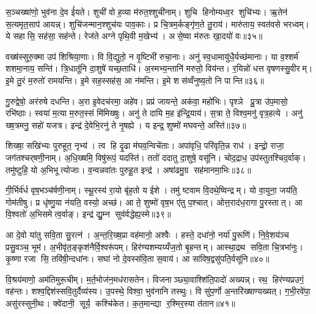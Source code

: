 स॒ञ्चख्षा॑णो॒ भुव॑ना दे॒व ई॑यते। शुची॑ वो ह॒व्या म॑रुत॒श्शुची॑नाम्। शुचि हिनोम्यध्व॒र शुचि॑भ्यः। ऋ॒तेन॑ स॒त्यमृत॒साप॑ आयन्न्। शुचि॑जन्मान॒श्शुच॑यः पाव॒काः। प्र चि॒त्रम॒र्कङ्गृ॑ण॒ते तु॒राय॑। मारु॑ताय॒ स्वत॑वसे भरध्वम्। ये सहासि॒ सह॑सा॒ सह॑न्ते। रेज॑ते अग्ने पृथि॒वी म॒खेभ्य॑। असे॒ष्वा म॑रुतः खा॒दयो॑ वः॥३५॥

वख्ष॑स्सुरु॒क्मा उप॑ शिश्रिया॒णाः। वि वि॒द्युतो॒ न वृ॒ष्टिभी॑ रुचा॒नाः। अनु॑ स्व॒धामायु॑धै॒र्यच्छ॑मानाः। या व॒श्शर्म॑ शशमा॒नाय॒ सन्ति॑। त्रि॒धातू॑नि दा॒शुषे॑ यच्छ॒ताधि॑। अ॒स्मभ्य॒न्तानि॑ मरुतो॒ विय॑न्त। र॒यिन्नो॑ धत्त वृषणस्सु॒वीरम्। इ॒मे तु॒रं म॒रुतो॑ रामयन्ति। इ॒मे सह॒स्सह॑स॒ आ न॑मन्ति। इ॒मे शस॑व्वँनुष्य॒तो नि पान्ति॥३६॥

गु॒रुद्वेषो॒ अर॑रुषे दधन्ति। अ॒रा इ॒वेदच॑रमा॒ अहे॑व। प्रप्र॑ जायन्ते॒ अक॑वा॒ महो॑भिः। पृश्ञे प्रु॒त्रा उ॑प॒मासो॒ रभि॑ष्ठाः। स्वया॑ म॒त्या म॒रुत॒स्सं मि॑मिख्षुः। अनु॑ ते दायि म॒ह इ॑न्द्रि॒याय॑। स॒त्रा ते॒ विश्व॒मनु॑ वृत्र॒हत्ये। अनु॑ ख्ष॒त्रमनु॒ सहो॑ यजत्र। इन्द्र॑ दे॒वेभि॒रनु॑ ते नृ॒षह्ये। य इन्द्र॒ शुष्मो॑ मघवन्ते॒ अस्ति॑॥३७॥

शिख्षा॒ सखि॑भ्यः पुरुहूत॒ नृभ्य॑। त्व हि दृ॒ढा म॑घव॒न्विचे॑ताः। अपा॑वृधि॒ परि॑वृति॒न्न राध॑। इन्द्रो॒ राजा॒ जग॑तश्चर्‌षणी॒नाम्। अ॒धि॒ख्षमि॒ विषु॑रूपं॒ यदस्ति॑। ततो॑ ददातु दा॒शुषे॒ वसू॑नि। चोद॒द्राध॒ उप॑स्तुतश्चिद॒र्वाक्। तमु॑ष्टुहि॒ यो अ॒भिभूत्योजाः। व॒न्वन्नवा॑तः पुरुहू॒त इन्द्र॑। अषा॑ढमु॒ग्र सह॑मानमा॒भिः॥३८॥

गी॒र्भिर्व॑र्ध वृष॒भञ्च॑र्\mbox{}षणी॒नाम्। स्थू॒रस्य॑ रा॒यो बृ॑ह॒तो य ईशे। तमु॑ ष्टवाम वि॒दथे॒ष्विन्द्रम्। यो वा॒युना॒ जय॑ति॒ गोम॑तीषु। प्र धृ॑ष्णु॒या न॑यति॒ वस्यो॒ अच्छ॑। आ ते॒ शुष्मो॑ वृष॒भ ए॑तु प॒श्चात्। ओत्त॒राद॑ध॒रागा पु॒रस्तात्। आ वि॒श्वतो॑ अ॒भिसमेत्व॒र्वाङ्। इन्द्र॑ द्यु॒म्न सुव॑र्वद्धेह्य॒स्मे॥३९॥\anuvakamend[व॒राहैर्वि॒श्वहा॑ऽजनिष्ट पू॒षोद्वरी॑वृजत्खा॒दयो॑ वः पा॒न्त्यस्त्या॒भिर्नव॑ च]

आ दे॒वो या॑तु सवि॒ता सु॒रत्न॑। अ॒न्त॒रि॒ख्ष॒प्रा वह॑मानो॒ अश्वैः। हस्ते॒ दधा॑नो॒ नर्या॑ पु॒रूणि॑। नि॒वे॒शय॑ञ्च प्रसु॒वञ्च॒ भूम॑। अ॒भीवृ॑त॒ङ्कृश॑नैर्वि॒श्वरू॑पम्। हिर॑ण्यशम्यय्यँज॒तो बृ॒हन्तम्। आस्था॒द्रथ सवि॒ता चि॒त्रभा॑नुः। कृ॒ष्णा रजा सि॒ तवि॑षी॒न्दधा॑नः। सघा॑ नो दे॒वस्स॑वि॒ता स॒वाय॑। आ सा॑विष॒द्वसु॑पति॒र्वसू॑नि॥४०॥

वि॒श्रय॑माणो॒ अम॑तिमुरू॒चीम्। म॒र्त॒भोज॑न॒मध॑रासतेन। विजनाञ्छ्या॒वाश्शि॑ति॒पादो॑ अख्यन्न्। रथ॒ हिर॑ण्यप्रउगं॒ वह॑न्तः। शश्व॒द्दिश॑स्सवि॒तुर्दैव्य॑स्य। उ॒पस्थे॒ विश्वा॒ भुव॑नानि तस्थुः। वि सु॑प॒र्णो अ॒न्तरि॑ख्षाण्यख्यत्। ग॒भी॒रवे॑पा॒ असु॑रस्सुनी॒थः। क्वे॑दानी॒ सूर्य॒ कश्चि॑केत। क॒त॒मान्द्या र॒श्मिर॒स्या त॑तान॥४१॥

